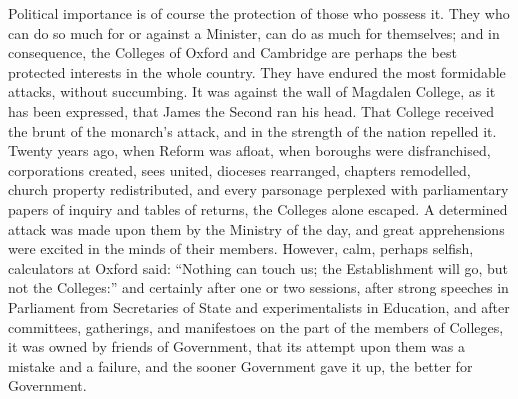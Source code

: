 Political importance is of
course the protection of those who possess it. They who can do so much
for or against a Minister, can do as much for themselves; and in
consequence, the Colleges of Oxford and Cambridge are perhaps the best
protected interests in the whole country. They have endured the most
formidable attacks, without succumbing. It was against the wall of
Magdalen College, as it has been expressed, that James the Second ran
his head. That College received the brunt of the monarch's attack, and
in the strength of the nation repelled it. Twenty years ago, when
Reform was afloat, when boroughs were disfranchised, corporations
created, sees united, dioceses rearranged, chapters remodelled, church
property redistributed, and every parsonage perplexed with
parliamentary papers of inquiry and tables of returns, the Colleges
alone escaped. A determined attack was made upon them by the Ministry
of the day, and great apprehensions were excited in the minds of their
members. However, calm, perhaps selfish, calculators at Oxford said: ``Nothing can touch us; the Establishment will go, but not the
Colleges:'' and certainly after one or two sessions, after strong
speeches in Parliament from Secretaries of State and experimentalists
in Education, and after committees, gatherings, and manifestoes on the
part of the members of Colleges, it was owned by friends of
Government, that its attempt upon them was a mistake and a failure,
and the sooner Government gave it up, the better for Government.

